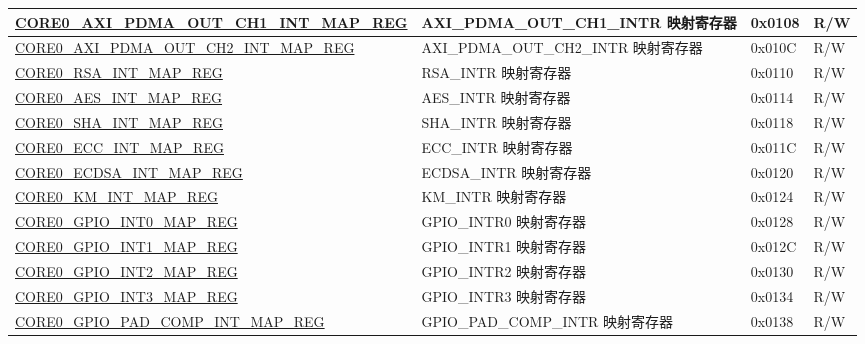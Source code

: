 \begin{longtable}{ | p{8.7cm} | p{6.2cm} | p{1.3cm} | p{1cm} | }
\hyperref[regdesc:CORE0AXIPDMAOUTCH1INTMAPREG]{CORE0\_AXI\_PDMA\_OUT\_CH1\_INT\_MAP\_REG} & AXI\_PDMA\_OUT\_CH1\_INTR 映射寄存器 & 0x0108 & R/W \\ \hline

\hyperref[regdesc:CORE0AXIPDMAOUTCH2INTMAPREG]{CORE0\_AXI\_PDMA\_OUT\_CH2\_INT\_MAP\_REG} & AXI\_PDMA\_OUT\_CH2\_INTR 映射寄存器 & 0x010C & R/W \\ \hline

\hyperref[regdesc:CORE0RSAINTMAPREG]{CORE0\_RSA\_INT\_MAP\_REG} & RSA\_INTR 映射寄存器 & 0x0110 & R/W \\ \hline

\hyperref[regdesc:CORE0AESINTMAPREG]{CORE0\_AES\_INT\_MAP\_REG} & AES\_INTR 映射寄存器 & 0x0114 & R/W \\ \hline

\hyperref[regdesc:CORE0SHAINTMAPREG]{CORE0\_SHA\_INT\_MAP\_REG} & SHA\_INTR 映射寄存器 & 0x0118 & R/W \\ \hline

\hyperref[regdesc:CORE0ECCINTMAPREG]{CORE0\_ECC\_INT\_MAP\_REG} & ECC\_INTR 映射寄存器 & 0x011C & R/W \\ \hline

\hyperref[regdesc:CORE0ECDSAINTMAPREG]{CORE0\_ECDSA\_INT\_MAP\_REG} & ECDSA\_INTR 映射寄存器 & 0x0120 & R/W \\ \hline

\hyperref[regdesc:CORE0KMINTMAPREG]{CORE0\_KM\_INT\_MAP\_REG} & KM\_INTR 映射寄存器 & 0x0124 & R/W \\ \hline


\hyperref[regdesc:CORE0GPIOINT0MAPREG]{CORE0\_GPIO\_INT0\_MAP\_REG} & GPIO\_INTR0 映射寄存器 & 0x0128 & R/W \\ \hline

\hyperref[regdesc:CORE0GPIOINT1MAPREG]{CORE0\_GPIO\_INT1\_MAP\_REG} & GPIO\_INTR1 映射寄存器 & 0x012C & R/W \\ \hline

\hyperref[regdesc:CORE0GPIOINT2MAPREG]{CORE0\_GPIO\_INT2\_MAP\_REG} & GPIO\_INTR2 映射寄存器 & 0x0130 & R/W \\ \hline

\hyperref[regdesc:CORE0GPIOINT3MAPREG]{CORE0\_GPIO\_INT3\_MAP\_REG} & GPIO\_INTR3 映射寄存器 & 0x0134 & R/W \\ \hline

\hyperref[regdesc:CORE0GPIOPADCOMPINTMAPREG]{CORE0\_GPIO\_PAD\_COMP\_INT\_MAP\_REG} & GPIO\_PAD\_COMP\_INTR 映射寄存器 & 0x0138 & R/W \\ \hline


\end{longtable}
